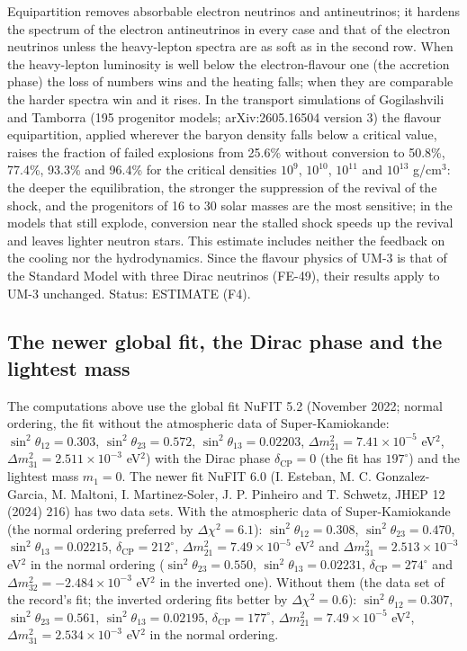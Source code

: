 \documentclass[
  10pt,
]{article}
\begin{document}
Equipartition removes absorbable electron neutrinos and antineutrinos;
it hardens the spectrum of the electron antineutrinos in every case and
that of the electron neutrinos unless the heavy-lepton spectra are as
soft as in the second row. When the heavy-lepton luminosity is well
below the electron-flavour one (the accretion phase) the loss of numbers
wins and the heating falls; when they are comparable the harder spectra
win and it rises. In the transport simulations of Gogilashvili and
Tamborra (195 progenitor models; arXiv:2605.16504 version 3) the flavour
equipartition, applied wherever the baryon density falls below a
critical value, raises the fraction of failed explosions from 25.6\%
without conversion to 50.8\%, 77.4\%, 93.3\% and 96.4\% for the critical
densities \(10^9\), \(10^{10}\), \(10^{11}\) and \(10^{13}\) g/cm\(^3\):
the deeper the equilibration, the stronger the suppression of the
revival of the shock, and the progenitors of 16 to 30 solar masses are
the most sensitive; in the models that still explode, conversion near
the stalled shock speeds up the revival and leaves lighter neutron
stars. This estimate includes neither the feedback on the cooling nor
the hydrodynamics. Since the flavour physics of UM-3 is that of the
Standard Model with three Dirac neutrinos (FE-49), their results apply
to UM-3 unchanged. Status: ESTIMATE (F4).

\hypertarget{the-newer-global-fit-the-dirac-phase-and-the-lightest-mass}{%
\subsection{The newer global fit, the Dirac phase and the lightest
mass}\label{the-newer-global-fit-the-dirac-phase-and-the-lightest-mass}}

The computations above use the global fit NuFIT 5.2 (November 2022;
normal ordering, the fit without the atmospheric data of
Super-Kamiokande: \(\sin^2\theta_{12} = 0.303\),
\(\sin^2\theta_{23} = 0.572\), \(\sin^2\theta_{13} = 0.02203\),
\(\Delta m^2_{21} = 7.41\times10^{-5}\) eV\(^2\),
\(\Delta m^2_{31} = 2.511\times10^{-3}\) eV\(^2\)) with the Dirac phase
\(\delta_{\mathrm{CP}} = 0\) (the fit has \(197^\circ\)) and the
lightest mass \(m_1 = 0\). The newer fit NuFIT 6.0 (I. Esteban, M. C.
Gonzalez-Garcia, M. Maltoni, I. Martinez-Soler, J. P. Pinheiro and T.
Schwetz, JHEP 12 (2024) 216) has two data sets. With the atmospheric
data of Super-Kamiokande (the normal ordering preferred by
\(\Delta\chi^2 = 6.1\)): \(\sin^2\theta_{12} = 0.308\),
\(\sin^2\theta_{23} = 0.470\), \(\sin^2\theta_{13} = 0.02215\),
\(\delta_{\mathrm{CP}} = 212^\circ\),
\(\Delta m^2_{21} = 7.49\times10^{-5}\) eV\(^2\) and
\(\Delta m^2_{31} = 2.513\times10^{-3}\) eV\(^2\) in the normal ordering
(\(\sin^2\theta_{23} = 0.550\), \(\sin^2\theta_{13} = 0.02231\),
\(\delta_{\mathrm{CP}} = 274^\circ\) and
\(\Delta m^2_{32} = -2.484\times10^{-3}\) eV\(^2\) in the inverted one).
Without them (the data set of the record's fit; the inverted ordering
fits better by \(\Delta\chi^2 = 0.6\)): \(\sin^2\theta_{12} = 0.307\),
\(\sin^2\theta_{23} = 0.561\), \(\sin^2\theta_{13} = 0.02195\),
\(\delta_{\mathrm{CP}} = 177^\circ\),
\(\Delta m^2_{21} = 7.49\times10^{-5}\) eV\(^2\),
\(\Delta m^2_{31} = 2.534\times10^{-3}\) eV\(^2\) in the normal
ordering.
\end{document}
